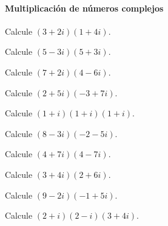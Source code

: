 

\paragraph{Multiplicación de números complejos}

\begin{ejercicio}
Calcule $(3+2i)(1+4i)$.
\end{ejercicio}

\begin{ejercicio}
Calcule $(5-3i)(5+3i)$.
\end{ejercicio}

\begin{ejercicio}
Calcule $(7+2i)(4-6i)$.
\end{ejercicio}

\begin{ejercicio}
Calcule $(2+5i)(-3+7i)$.
\end{ejercicio}

\begin{ejercicio}
Calcule $(1+i)(1+i)(1+i)$.
\end{ejercicio}

\begin{ejercicio}
Calcule $(8-3i)(-2-5i)$.
\end{ejercicio}

\begin{ejercicio}
Calcule $(4+7i)(4-7i)$.
\end{ejercicio}

\begin{ejercicio}
Calcule $(3+4i)(2+6i)$.
\end{ejercicio}

\begin{ejercicio}
Calcule $(9-2i)(-1+5i)$.
\end{ejercicio}

\begin{ejercicio}
Calcule $(2+i)(2-i)(3+4i)$.
\end{ejercicio}
